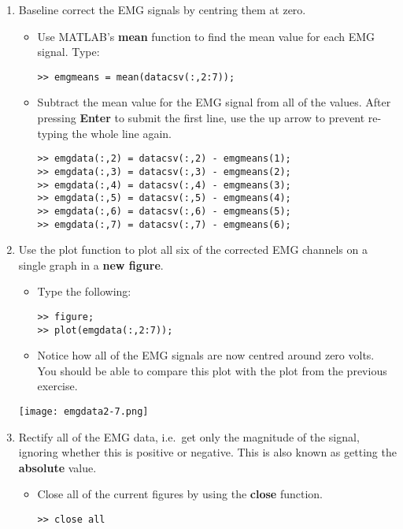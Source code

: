 \documentclass[12pt,a4paper]{article}
\begin{document}
\begin{enumerate}
	\item Baseline correct the EMG signals by centring them at zero.
	\begin{itemize}
		\item Use MATLAB's \textbf{mean} function to find the mean value for each EMG signal.  Type:
		\begin{lstlisting}[style=Matlab-editor]
>> emgmeans = mean(datacsv(:,2:7));
		\end{lstlisting}		
		\item Subtract the mean value for the EMG signal from all of the values.  After pressing \textbf{Enter} to submit the first line, use the up arrow to prevent re-typing the whole line again.
		\begin{lstlisting}[style=Matlab-editor]
>> emgdata(:,2) = datacsv(:,2) - emgmeans(1);
>> emgdata(:,3) = datacsv(:,3) - emgmeans(2);
>> emgdata(:,4) = datacsv(:,4) - emgmeans(3);
>> emgdata(:,5) = datacsv(:,5) - emgmeans(4);
>> emgdata(:,6) = datacsv(:,6) - emgmeans(5);
>> emgdata(:,7) = datacsv(:,7) - emgmeans(6);
		\end{lstlisting}
	\end{itemize}
	\item Use the plot function to plot all six of the corrected EMG channels on a single graph in a \textbf{new figure}.
	\begin{itemize}
		\item Type the following:
		\begin{lstlisting}[style=Matlab-editor]
>> figure;
>> plot(emgdata(:,2:7));
		\end{lstlisting}		
		\item Notice how all of the EMG signals are now centred around zero volts.  
		You should be able to compare this plot with the plot from the previous exercise.			
	\end{itemize}		
	\begin{center}
		\texttt{[image: emgdata2-7.png]}
	\end{center}
	\item Rectify all of the EMG data, i.e.~get only the magnitude of the signal, ignoring whether this is positive or negative.  This is also known as getting the \textbf{absolute} value.
	\begin{itemize}
		\item Close all of the current figures by using the \textbf{close} function.
		\begin{lstlisting}[style=Matlab-editor]
>> close all
		\end{lstlisting}

\end{itemize}
\end{enumerate}
\end{document}
